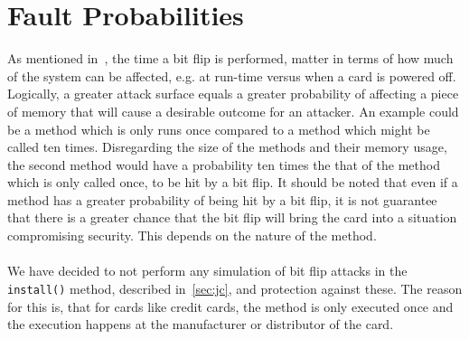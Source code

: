 \section{Fault Probabilities}
As mentioned in~, the time a bit flip is performed, matter in terms of how much of the system can be affected, e.g. at run-time versus when a card is powered off. Logically, a greater attack surface equals a greater probability of affecting a piece of memory that will cause a desirable outcome for an attacker. An example could be a method which is only runs once compared to a method which might be called ten times. Disregarding the size of the methods and their memory usage, the second method would have a probability ten times the that of the method which is only called once, to be hit by a bit flip. It should be noted that even if a method has a greater probability of being hit by a bit flip, it is not guarantee that there is a greater chance that the bit flip will bring the card into a situation compromising security. This depends on the nature of the method.\\\\
We have decided to not perform any simulation of bit flip attacks in the \texttt{install()} method, described in~\cref{sec:jc}, and protection against these. The reason for this is, that for cards like credit cards, the method is only executed once and the execution happens at the manufacturer or distributor of the card.

%